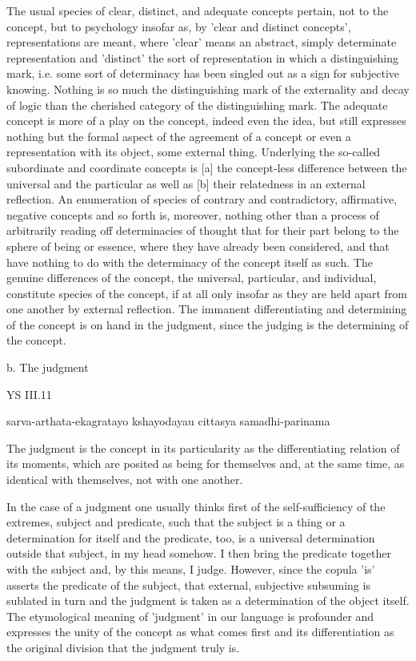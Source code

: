 The usual species of clear, distinct, and adequate concepts pertain,
not to the concept, but to psychology insofar as,
by 'clear and distinct concepts', representations are meant,
where 'clear' means an abstract, simply determinate representation and
'distinct' the sort of representation in which a distinguishing mark,
i.e. some sort of determinacy has been singled out as
a sign for subjective knowing.
Nothing is so much the distinguishing mark of the externality and
decay of logic than the cherished category of the distinguishing mark.
The adequate concept is more of a play on the concept,
indeed even the idea, but still expresses nothing but
the formal aspect of the agreement of a concept or
even a representation with its object, some external thing.
Underlying the so-called subordinate and coordinate concepts is
[a] the concept-less difference between the universal and the particular
as well as [b] their relatedness in an external reflection.
An enumeration of species of contrary and contradictory,
affirmative, negative concepts and so forth is, moreover, nothing other than a
process of arbitrarily reading off determinacies of thought that
for their part belong to the sphere of being or essence,
where they have already been considered, and that have nothing to do
with the determinacy of the concept itself as such.
The genuine differences of the concept,
the universal, particular, and individual,
constitute species of the concept, if at all only insofar as
they are held apart from one another by external reflection.
The immanent differentiating and determining of
the concept is on hand in the judgment,
since the judging is the determining of the concept.

b. The judgment

YS III.11

sarva-arthata-ekagratayo kshayodayau cittasya samadhi-parinama

The judgment is the concept in its particularity
as the differentiating relation of its moments,
which are posited as being for themselves
and, at the same time, as identical with themselves,
not with one another.

In the case of a judgment one usually thinks first of
the self-sufficiency of the extremes, subject and predicate,
such that the subject is a thing or a determination for itself and
the predicate, too, is a universal determination outside that subject, in my head somehow.
I then bring the predicate together with the subject and, by this means, I judge.
However, since the copula 'is' asserts the predicate of the subject,
that external, subjective subsuming is sublated in turn and
the judgment is taken as a determination of the object itself.
The etymological meaning of 'judgment' in our language is
profounder and expresses the unity of the concept as what comes first and
its differentiation as the original division that the judgment truly is.

